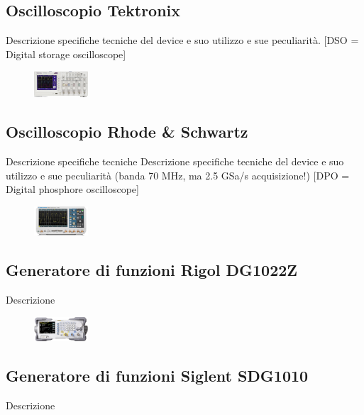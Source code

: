 \documentclass[journal]{IEEEtran}
\begin{document}
\subsection{\textbf{Oscilloscopio Tektronix}}
Descrizione specifiche tecniche del device e suo utilizzo e sue peculiarità. [DSO = Digital storage oscilloscope]

\begin{figure}[h!]
  \centering
  \includegraphics[width=0.18\textwidth]{lab-reports/Schematics-and-graphics/TEK Osc.png}
\end{figure}

\subsection{\textbf{Oscilloscopio Rhode & Schwartz}}
Descrizione specifiche tecniche 
Descrizione specifiche tecniche del device e suo utilizzo e sue peculiarità (banda 70 MHz, ma 2.5 GSa/s acquisizione!)
[DPO = Digital phosphore oscilloscope]

\begin{figure}[h!]
  \centering
  \includegraphics[width=0.18\textwidth]{lab-reports/Schematics-and-graphics/RS Osc.png}
\end{figure}

\subsection{\textbf{Generatore di funzioni Rigol DG1022Z}}
Descrizione

\begin{figure}[h!]
  \centering
  \includegraphics[width=0.18\textwidth]{lab-reports/Schematics-and-graphics/RIGOL Gen.png}
\end{figure}

\subsection{\textbf{Generatore di funzioni Siglent SDG1010}}
Descrizione
\end{document}
